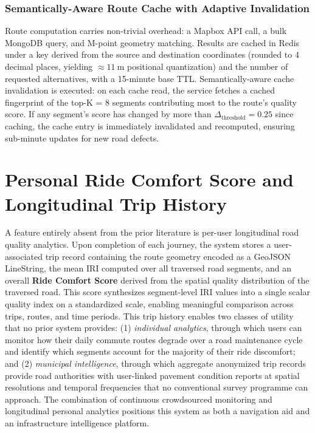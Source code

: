 \documentclass[conference]{IEEEtran}
\begin{document}
\subsubsection{Semantically-Aware Route Cache with Adaptive Invalidation}
Route computation carries non-trivial overhead: a Mapbox API call, a bulk MongoDB query, and M-point geometry matching.
Results are cached in Redis under a key derived from the source and destination coordinates (rounded to 4 decimal places, yielding $\approx 11~\text{m}$ positional quantization) and the number of requested alternatives, with a 15-minute base TTL.
Semantically-aware cache invalidation is executed: on each cache read, the service fetches a cached fingerprint of the top-K = 8 segments contributing most to the route's quality score.
If any segment's score has changed by more than $\Delta_{\text{threshold}} = 0.25$ since caching, the cache entry is immediately invalidated and recomputed, ensuring sub-minute updates for new road defects.

\section{Personal Ride Comfort Score and Longitudinal Trip History}
A feature entirely absent from the prior literature is per-user longitudinal road quality analytics.
Upon completion of each journey, the system stores a user-associated trip record containing the route geometry encoded as a GeoJSON LineString, the mean IRI computed over all traversed road segments, and an overall \textbf{Ride Comfort Score} derived from the spatial quality distribution of the traversed road.
This score synthesizes segment-level IRI values into a single scalar quality index on a standardized scale, enabling meaningful comparison across trips, routes, and time periods.
This trip history enables two classes of utility that no prior system provides: (1) \textit{individual analytics}, through which users can monitor how their daily commute routes degrade over a road maintenance cycle and identify which segments account for the majority of their ride discomfort;
and (2) \textit{municipal intelligence}, through which aggregate anonymized trip records provide road authorities with user-linked pavement condition reports at spatial resolutions and temporal frequencies that no conventional survey programme can approach.
The combination of continuous crowdsourced monitoring and longitudinal personal analytics positions this system as both a navigation aid and an infrastructure intelligence platform.
\end{document}
